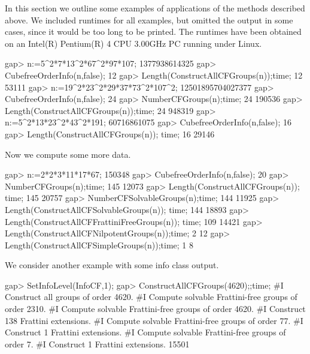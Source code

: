 
In this section we outline some examples of applications of
the methods described above. We
included runtimes for all examples, but omitted the output
in some cases, since it would be too long to be printed.
The runtimes have been obtained on an Intel(R) Pentium(R) 4 CPU 3.00GHz PC running under Linux.

\beginexample
gap> n:=5^2*7*13^2*67^2*97*107;
1377938614325
gap> CubefreeOrderInfo(n,false);
12
gap> Length(ConstructAllCFGroups(n));time;
12
53111
\endexample
\beginexample
gap> n:=19^2*23^2*29*37*73^2*107^2;
12501895704027377
gap> CubefreeOrderInfo(n,false);
24
gap> NumberCFGroups(n);time;
24
190536
gap> Length(ConstructAllCFGroups(n));time;
24
948319
\endexample
\beginexample
gap> n:=5^2*13*23^2*43^2*191;
60716861075
gap> CubefreeOrderInfo(n,false);
16
gap> Length(ConstructAllCFGroups(n)); time;
16
29146
\endexample

Now we compute some more data.

\beginexample
gap>  n:=2*2*3*11*17*67;
150348
gap> CubefreeOrderInfo(n,false);
20
gap> NumberCFGroups(n);time;
145
12073
gap> Length(ConstructAllCFGroups(n)); time;
145
20757
gap> NumberCFSolvableGroups(n);time;
144
11925
gap> Length(ConstructAllCFSolvableGroups(n)); time;
144
18893
gap> Length(ConstructAllCFFrattiniFreeGroups(n)); time;
109
14421
gap> Length(ConstructAllCFNilpotentGroups(n));time;
2
12
gap> Length(ConstructAllCFSimpleGroups(n));time;
1
8
\endexample


We consider another example with some info class output.

\beginexample
gap> SetInfoLevel(InfoCF,1);
gap> ConstructAllCFGroups(4620);;time;
#I  Construct all groups of order 4620.
#I    Compute solvable Frattini-free groups of order 2310.
#I    Compute solvable Frattini-free groups of order 4620.
#I  Construct 138 Frattini extensions.
#I    Compute solvable Frattini-free groups of order 77.
#I  Construct 1 Frattini extensions.
#I    Compute solvable Frattini-free groups of order 7.
#I  Construct 1 Frattini extensions.
15501
\endexample


